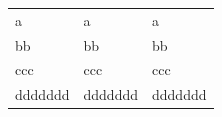 \documentclass{standalone}
\begin{document}
	\begin{tabular}{lll}
		a & a & a \\
		bb & bb & bb \\
		ccc & ccc & ccc \\
		ddddddd & ddddddd & ddddddd
	\end{tabular}
\end{document}
